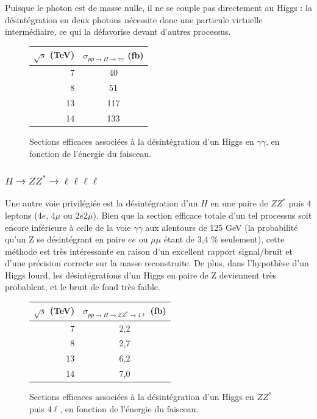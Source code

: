 \documentclass[11pt]{article} %
\begin{document}
Puisque le photon est de masse nulle, il ne se couple pas directement au Higgs : la désintégration en deux photons nécessite donc une particule virtuelle intermédiaire, ce qui la défavorise devant d'autres processus.

\begin{figure}[H]
\centering
\begin{tabular}{|r|c|} 
   \hline
   $\sqrt{s}$ (TeV) & $\sigma_{pp \to H \to \gamma \gamma}$ (fb) \\
    \hline
   7 &  40\\
\hline
   8 & 51 \\
\hline
   13 & 117  \\
\hline
   14 & 133 \\
  \hline
\end{tabular}
\caption{Sections efficaces associées à la désintégration d'un Higgs en $\gamma \gamma$, en fonction de l'énergie du faisceau.}
\end{figure}



\subsubsection{$H \to ZZ^* \to \ell \ell \ell \ell$}

Une autre voie privilégiée est la désintégration d'un $H$ en une paire de $ZZ^*$ puis 4 leptons (4$e$, 4$\mu$ ou 2$e$2$\mu$). Bien que la section efficace totale d'un tel processus soit encore inférieure à celle de la voie $\gamma \gamma$ aux alentours de 125 GeV  (la probabilité qu'un Z se désintégrant en paire $ee$ ou $\mu \mu$ étant de 3,4 \% seulement), cette méthode est très intéressante en raison d'un excellent rapport signal/bruit et d'une précision correcte sur la masse reconstruite. De plus, dans l'hypothèse d'un Higgs lourd, les désintégrations d'un Higgs en paire de Z deviennent très probablent, et le bruit de fond très faible.

\begin{figure}[H]
\centering
\begin{tabular}{|r|c|} 
   \hline
   $\sqrt{s}$ (TeV) & $\sigma_{pp \to H \to ZZ^* \to 4\ell}$ (fb) \\
    \hline
   7 &  2,2\\
\hline
   8 & 2,7 \\
\hline
   13 & 6,2  \\
\hline
   14 & 7,0 \\
  \hline
\end{tabular}
\caption{Sections efficaces associées à la désintégration d'un Higgs en $ZZ^*$ puis 4$\ell$, en fonction de l'énergie du faisceau.}
\end{figure}
\end{document}
